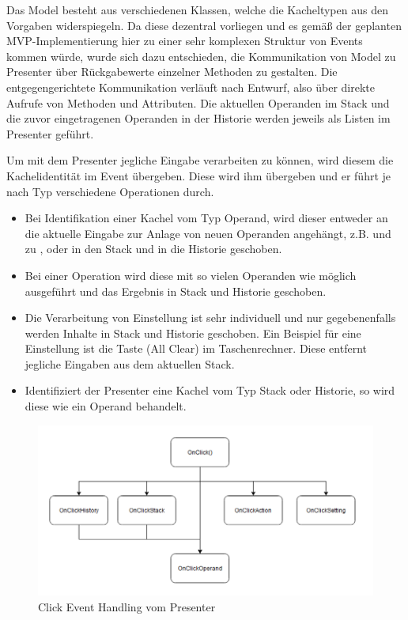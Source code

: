 Das Model besteht aus verschiedenen Klassen, welche die Kacheltypen aus den Vorgaben widerspiegeln. Da diese dezentral vorliegen und es gemäß der geplanten MVP-Implementierung hier zu einer sehr komplexen Struktur von Events kommen würde, wurde sich dazu entschieden, die Kommunikation von Model zu Presenter über Rückgabewerte einzelner Methoden zu gestalten. Die entgegengerichtete Kommunikation verläuft nach Entwurf, also über direkte Aufrufe von Methoden und Attributen. Die aktuellen Operanden im Stack und die zuvor eingetragenen Operanden in der Historie werden jeweils als Listen im Presenter geführt.

Um mit dem Presenter jegliche Eingabe verarbeiten zu können, wird diesem die Kachelidentität im Event übergeben. Diese wird ihm übergeben und er führt je nach Typ verschiedene Operationen durch.

\begin{itemize}
	\item Bei Identifikation einer Kachel vom Typ Operand, wird dieser entweder an die aktuelle Eingabe zur Anlage von neuen Operanden angehängt, z.B.  und  zu , oder in den Stack und in die Historie geschoben. 
	\item Bei einer Operation wird diese mit so vielen Operanden wie möglich ausgeführt und das Ergebnis in Stack und Historie geschoben.
	\item Die Verarbeitung von Einstellung ist sehr individuell und nur gegebenenfalls werden Inhalte in Stack und Historie geschoben. Ein Beispiel für eine Einstellung ist die Taste  (All Clear) im Taschenrechner. Diese entfernt jegliche Eingaben aus dem aktuellen Stack.
	\item Identifiziert der Presenter eine Kachel vom Typ Stack oder Historie, so wird diese wie ein Operand behandelt.
\end{itemize}


\begin{figure}[!h]
	\includegraphics[width=1\columnwidth]{img/click-event-handling-vom-presenter}
	\caption[Click Event Handling vom Presenter]{Click Event Handling vom Presenter\footnotemark}
\end{figure}


